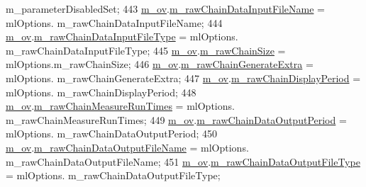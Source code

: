 \begin{DoxyCode}
      m\_parameterDisabledSet;
443   \hyperlink{class_q_u_e_s_o_1_1_metropolis_hastings_s_g_options_a9d4792d9fc2dc5439b8ab489b0c236eb}{m\_ov}.\hyperlink{class_q_u_e_s_o_1_1_mh_options_values_a3d031c2cdc8f17c589e999d11782c8ba}{m\_rawChainDataInputFileName}                 = mlOptions.
      m\_rawChainDataInputFileName;
444   \hyperlink{class_q_u_e_s_o_1_1_metropolis_hastings_s_g_options_a9d4792d9fc2dc5439b8ab489b0c236eb}{m\_ov}.\hyperlink{class_q_u_e_s_o_1_1_mh_options_values_a61974cb51a10d03dcd317dcd10f2684f}{m\_rawChainDataInputFileType}                 = mlOptions.
      m\_rawChainDataInputFileType;
445   \hyperlink{class_q_u_e_s_o_1_1_metropolis_hastings_s_g_options_a9d4792d9fc2dc5439b8ab489b0c236eb}{m\_ov}.\hyperlink{class_q_u_e_s_o_1_1_mh_options_values_a18dcb5898ba7101ae11856e866742aaf}{m\_rawChainSize}                              = mlOptions.m\_rawChainSize;
446   \hyperlink{class_q_u_e_s_o_1_1_metropolis_hastings_s_g_options_a9d4792d9fc2dc5439b8ab489b0c236eb}{m\_ov}.\hyperlink{class_q_u_e_s_o_1_1_mh_options_values_a9d540978290d39df801e32f183450859}{m\_rawChainGenerateExtra}                     = mlOptions.
      m\_rawChainGenerateExtra;
447   \hyperlink{class_q_u_e_s_o_1_1_metropolis_hastings_s_g_options_a9d4792d9fc2dc5439b8ab489b0c236eb}{m\_ov}.\hyperlink{class_q_u_e_s_o_1_1_mh_options_values_a6d11f0ea62107b789da99befe29ebffa}{m\_rawChainDisplayPeriod}                     = mlOptions.
      m\_rawChainDisplayPeriod;
448   \hyperlink{class_q_u_e_s_o_1_1_metropolis_hastings_s_g_options_a9d4792d9fc2dc5439b8ab489b0c236eb}{m\_ov}.\hyperlink{class_q_u_e_s_o_1_1_mh_options_values_a6fcc2efc9146b68548e62d707aeed883}{m\_rawChainMeasureRunTimes}                   = mlOptions.
      m\_rawChainMeasureRunTimes;
449   \hyperlink{class_q_u_e_s_o_1_1_metropolis_hastings_s_g_options_a9d4792d9fc2dc5439b8ab489b0c236eb}{m\_ov}.\hyperlink{class_q_u_e_s_o_1_1_mh_options_values_ad838a3095d5158e27b9af55597822d31}{m\_rawChainDataOutputPeriod}                  = mlOptions.
      m\_rawChainDataOutputPeriod;
450   \hyperlink{class_q_u_e_s_o_1_1_metropolis_hastings_s_g_options_a9d4792d9fc2dc5439b8ab489b0c236eb}{m\_ov}.\hyperlink{class_q_u_e_s_o_1_1_mh_options_values_a0ff310cdab62e1bdbff8663f8a6b1c77}{m\_rawChainDataOutputFileName}                = mlOptions.
      m\_rawChainDataOutputFileName;
451   \hyperlink{class_q_u_e_s_o_1_1_metropolis_hastings_s_g_options_a9d4792d9fc2dc5439b8ab489b0c236eb}{m\_ov}.\hyperlink{class_q_u_e_s_o_1_1_mh_options_values_ae435f8be38f9f6407a2e0f75c53b4e76}{m\_rawChainDataOutputFileType}                = mlOptions.
      m\_rawChainDataOutputFileType;

\end{DoxyCode}
